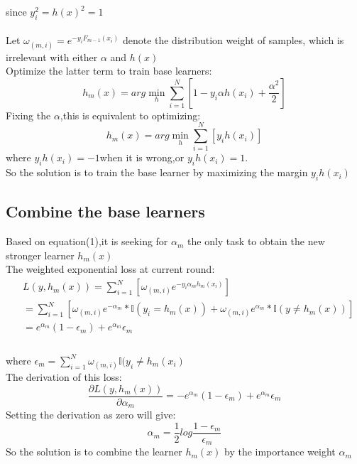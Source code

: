 \documentclass[journal, a4paper]{IEEEtran}
\begin{document}
since $y_{i}^{2}=h(x)^{2}=1$\\\\
Let $\omega_{(m,i)}=e^{-y_{i}F_{m-1}(x_{i})}$ denote the distribution weight of samples, which is irrelevant with either $\alpha$ and $h(x)$\\
Optimize the latter term to train base learners:
\begin{equation}
h_{m}(x)=arg\min_{h}\sum_{i=1}^{N}[1-y_{i}\alpha h(x_{i})+\dfrac{\alpha^{2}}{2}]
\end{equation}
Fixing the $\alpha$,this is equivalent to optimizing:
\begin{equation}
h_{m}(x)=arg \min_{h}\sum_{i=1}^{N}[y_{i}h(x_{i})]
\end{equation}
where $y_{i}h(x_{i})=-1$when it is wrong,or $y_{i}h(x_{i})=1$.\\
So the solution is to train the base learner by maximizing the margin $y_{i}h(x_{i})$
\subsection{Combine the base learners}
Based on equation(1),it is seeking for $\alpha _{m}$ the only task to obtain the new stronger learner $h_{m}(x)$\\
The weighted exponential loss at current round:
\begin{equation}
\begin{aligned}
&L(y,h_{m}(x))=\sum _{i=1}^{N}[\omega _{(m,i)}e^{-y_{i}\alpha _{m}h_{m}(x_{i})}]\\&=\sum _{i=1}^{N}[\omega_{(m,i)}e^{-\alpha _{m}}*\mathbb I(y_{i}=h_{m}(x))+\omega_{(m,i)}e^{\alpha _{m}}*\mathbb I(y\neq h_{m}(x))]\\&=e^{\alpha_{m}}(1-\epsilon _{m})+e^{\alpha _{m}}\epsilon_{m}\\
\end{aligned}
\end{equation}
\\
where $\epsilon _{m}=\sum _{i=1}^{N}\omega _{(m,i)}\mathbb I(y_{i}\neq h_{m}(x_{i})$\\
The derivation of this loss:
$$\dfrac{\partial L(y,h_{m}(x))}{\partial \alpha_{m}}=-e^{\alpha _{m}}(1-\epsilon _{m})+e^{\alpha _{m}}\epsilon _{m}$$
Setting the derivation as zero will give:
$$\alpha _{m}=\dfrac{1}{2}log\dfrac{1-\epsilon_{m}}{\epsilon_{m}}$$
So the solution is to combine the learner $h_{m}(x)$ by the importance weight $\alpha_{m}$
\end{document}
